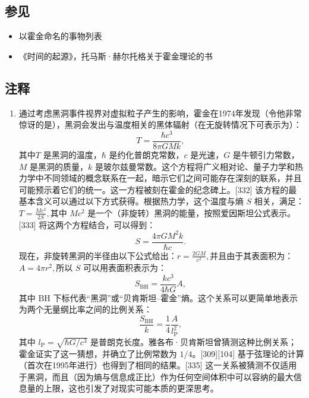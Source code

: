 \subsection{参见}
\begin{itemize}
\item 以霍金命名的事物列表  
\item 《时间的起源》，托马斯·赫尔托格关于霍金理论的书
\end{itemize}
\subsection{注释}  
\begin{enumerate}
\item 通过考虑黑洞事件视界对虚拟粒子产生的影响，霍金在1974年发现（令他非常惊讶的是），黑洞会发出与温度相关的黑体辐射（在无旋转情况下可表示为）：
\[ T = \frac{\hbar c^{3}}{8 \pi G M k},~\]
其中\( T \) 是黑洞的温度，\( \hbar \) 是约化普朗克常数，\( c \) 是光速，\( G \) 是牛顿引力常数， \( M \) 是黑洞的质量，\( k \) 是玻尔兹曼常数。这个方程将广义相对论、量子力学和热力学中不同领域的概念联系在一起，暗示它们之间可能存在深刻的联系，并且可能预示着它们的统一。这一方程被刻在霍金的纪念碑上。[332] 该方程的最基本含义可以通过以下方式获得。根据热力学，这个温度与熵 \( S \) 相关，满足：\(T = \frac{Mc^{2}}{2S}, \)其中 \( Mc^{2} \) 是一个（非旋转）黑洞的能量，按照爱因斯坦公式表示。[333] 将这两个方程结合，可以得到：
\[ S = \frac{4\pi G M^{2} k}{\hbar c}.~\]
现在，非旋转黑洞的半径由以下公式给出：\(r = \frac{2GM}{c^{2}}, \)并且由于其表面积为：\(A = 4\pi r^{2}, \)所以 \( S \) 可以用表面积表示为：
\[ S_{\text{BH}} = \frac{k c^{3}}{4\hbar G} A,~\]
其中 BH 下标代表“黑洞”或“贝肯斯坦–霍金”熵。这个关系可以更简单地表示为两个无量纲比率之间的比例关系：
\[ \frac{S_{\text{BH}}}{k} = \frac{1}{4} \frac{A}{l_{\text{P}}^{2}},~\]
其中 \( l_{\text{P}} = \sqrt{\hbar G / c^{3}} \) 是普朗克长度。雅各布·贝肯斯坦曾猜测这种比例关系；霍金证实了这一猜想，并确立了比例常数为 \( 1/4 \)。[309][104] 基于弦理论的计算（首次在1995年进行）也得到了相同的结果。[335] 这一关系被猜测不仅适用于黑洞，而且（因为熵与信息成正比）作为任何空间体积中可以容纳的最大信息量的上限，这也引发了对现实可能本质的更深思考。
\end{enumerate}